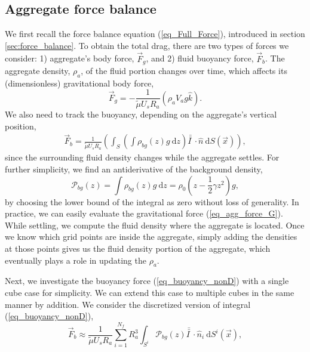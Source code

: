 \subsection{Aggregate force balance}
We first recall the force balance equation (\ref{eq_Full_Force}), introduced in section \ref{sec:force_balance}. To obtain the total drag, there are two types of forces we consider: 1) aggregate's body force, $\vec{F}_g$, and 2) fluid buoyancy force, $\vec{F}_b$. 
The aggregate density, $\rho_a$, of the fluid portion changes over time, which affects its (dimensionless) gravitational body force,
\begin{equation}
	\vec{F}_g = 
	- \frac{1}{\tilde{\mu} U_s R_a} 
	\left( \rho_a V_a g \hat{k}	 \right).
	\label{eq_agg_force_G}
\end{equation}
We also need to track the buoyancy, depending on the aggregate's vertical position,
\begin{align}
	\vec{F}_{b}
	 = \frac{1}{\tilde{\mu} U_s R_a} 
	 \left(
	  \int_{S} \left( 
	  \int \rho_{bg}(z) g \ \textrm{d}z 
	  \right) \bar{\bar{I \ }}  \cdot
	 \hat{n} \ \textrm{d}S (\vec{x})
   \right),
   \label{eq_buoyancy_nonD}
\end{align}
since the surrounding fluid density changes while the aggregate settles.
For further simplicity, we find an antiderivative of the background density,
\begin{equation}
	\mathcal{P}_{bg}(z) =  \int \rho_{bg}(z) g \ \textrm{d}z 
	 = \rho_0 \left( z - \frac{1}{2}\gamma z^2 \right) g,
\end{equation}
by choosing the lower bound of the integral as zero without loss of generality.
In practice, we can easily evaluate the gravitational force (\ref{eq_agg_force_G}). While settling, we compute the fluid density where the aggregate is located. Once we know which grid points are inside the aggregate, simply adding the densities at those points gives us the fluid density portion of the aggregate, which eventually plays a role in updating the $\rho_a$. 
\par
Next, we investigate the buoyancy force (\ref{eq_buoyancy_nonD}) with a single cube case for simplicity. 
We can extend this case to multiple cubes in the same manner by addition. We consider the discretized version of integral (\ref{eq_buoyancy_nonD}), 
\begin{equation}
	\vec{F}_b \approx
	\frac{1}{\tilde{\mu} U_s R_a} 
	\sum_{i=1}^{N_f}
	 R_a^3 \int_{S^i} 
		\mathcal{P}_{bg}(z) 
	 \bar{\bar{I \ }}  \cdot
	\hat{n}_i \ \textrm{d}S^i (\vec{x}),
\label{eq_buoyancy_discrete2}
\end{equation}
